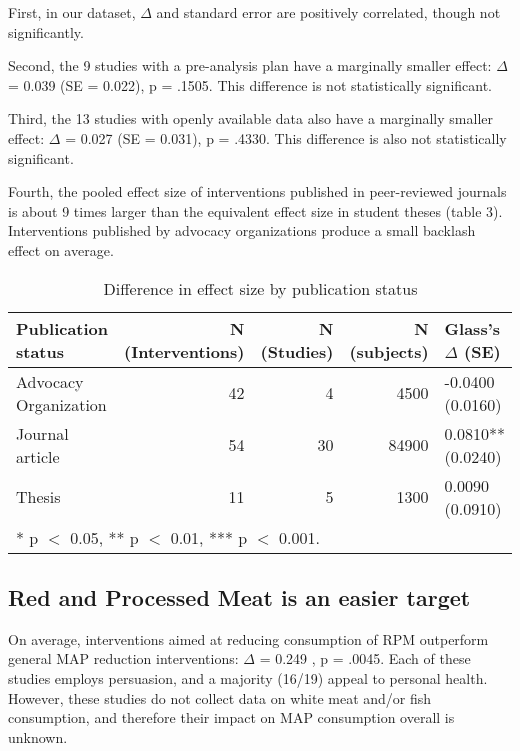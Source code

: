 \documentclass[sn-nature,pdflatex]{sn-jnl}
\begin{document}
First, in our dataset, \(\Delta\) and standard error are positively
correlated, though not significantly.

\begin{comment} 
good place for a figure?
\end{comment}

Second, the 9 studies with a pre-analysis plan have a marginally smaller
effect: \(\Delta\) = 0.039 (SE = 0.022), p = .1505. This difference is
not statistically significant.

Third, the 13 studies with openly available data also have a marginally
smaller effect: \(\Delta\) = 0.027 (SE = 0.031), p = .4330. This
difference is also not statistically significant.

Fourth, the pooled effect size of interventions published in
peer-reviewed journals is about 9 times larger than the equivalent
effect size in student theses (table 3). Interventions published by
advocacy organizations produce a small backlash effect on average.

\begin{table}[!h]
\centering
\caption{\label{tab:tab:table_three}Difference in effect size by publication status}
\centering
\begin{tabular}[t]{lrrrl}
\toprule
Publication status & N (Interventions) & N (Studies) & N (subjects) & Glass's $\Delta$ (SE)\\
\midrule
Advocacy Organization & 42 & 4 & 4500 & -0.0400 (0.0160)\\
Journal article & 54 & 30 & 84900 & 0.0810** (0.0240)\\
Thesis & 11 & 5 & 1300 & 0.0090 (0.0910)\\
\bottomrule
\multicolumn{5}{l}{\rule{0pt}{1em}* p $<$ 0.05, ** p $<$ 0.01, *** p $<$ 0.001.}\\
\end{tabular}
\end{table}

\subsection{Red and Processed Meat is an easier target}\label{sec2.4}

On average, interventions aimed at reducing consumption of RPM
outperform general MAP reduction interventions: \(\Delta\) = 0.249
, p = .0045. Each of these studies employs
persuasion, and a majority (16/19) appeal to personal health. However,
these studies do not collect data on white meat and/or fish consumption,
and therefore their impact on MAP consumption overall is unknown.
\end{document}

